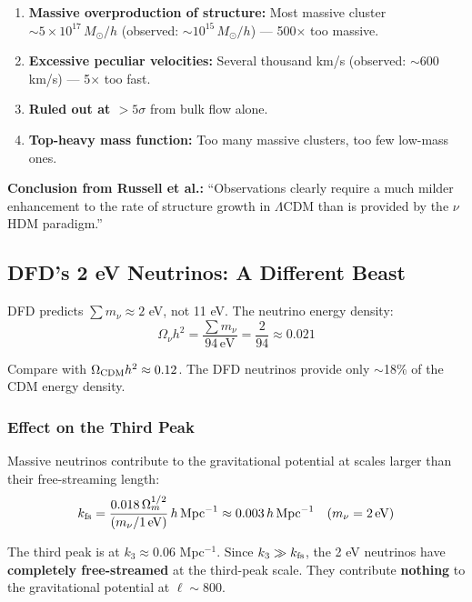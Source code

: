 \documentclass[11pt,a4paper]{article}
\begin{document}
\begin{enumerate}
\item \textbf{Massive overproduction of structure:} Most massive cluster $\sim 5 \times 10^{17}\,M_\odot/h$ (observed: $\sim 10^{15}\,M_\odot/h$) --- 500$\times$ too massive.
\item \textbf{Excessive peculiar velocities:} Several thousand km/s (observed: $\sim 600$ km/s) --- 5$\times$ too fast.
\item \textbf{Ruled out at $>5\sigma$} from bulk flow alone.
\item \textbf{Top-heavy mass function:} Too many massive clusters, too few low-mass ones.
\end{enumerate}

\textbf{Conclusion from Russell et al.:} ``Observations clearly require a much milder enhancement to the rate of structure growth in $\Lambda$CDM than is provided by the $\nu$HDM paradigm.''

\subsection{DFD's 2 eV Neutrinos: A Different Beast}

DFD predicts $\sum m_\nu \approx 2$ eV, not 11 eV. The neutrino energy density:
\begin{equation}
\Omega_\nu h^2 = \frac{\sum m_\nu}{94\,\text{eV}} = \frac{2}{94} \approx 0.021
\end{equation}

Compare with $\Omega_{\rm CDM}h^2 \approx 0.12$. The DFD neutrinos provide only $\sim$18\% of the CDM energy density.

\subsubsection{Effect on the Third Peak}

Massive neutrinos contribute to the gravitational potential at scales larger than their free-streaming length:
\begin{equation}
k_{\rm fs} = \frac{0.018\,\Omega_m^{1/2}}{(m_\nu/1\,\text{eV})}\,h\,\text{Mpc}^{-1} \approx 0.003\,h\,\text{Mpc}^{-1} \quad (m_\nu = 2\,\text{eV})
\end{equation}

The third peak is at $k_3 \approx 0.06$ Mpc$^{-1}$. Since $k_3 \gg k_{\rm fs}$, the 2 eV neutrinos have \textbf{completely free-streamed} at the third-peak scale. They contribute \textbf{nothing} to the gravitational potential at $\ell \sim 800$.
\end{document}
